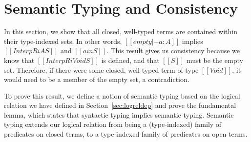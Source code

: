 \documentclass[acmsmall,screen=true,
\ifpublic review=false\else,review=true\fi
  ,anonymous=\ifanonymous true\else false\fi]{acmart}
\newcommand{\lang}{$\lambda^H$\xspace}
\newcommand{\scw}[1]{}
\newcommand{\yl}[1]{}
\begin{document}
\section{Semantic Typing and Consistency}
\label{sec:logrelproof}
\yl{todo: rename all variables from i,j to n}
\scw{Would it make sense to define the notation $a \in [\![A]\!]^i$ when
there exists some $S$ such that $[[InterpR i A S]]$ and $[[a in S]]$ ?}



In this section, we show that all closed, well-typed terms are contained
within their type-indexed sets. In other words, $[[empty |- a : A]]$ implies
$[[InterpR i A S]]$ and $[[a in S]]$.  This result gives us consistency
because we know that $[[InterpR i Void S]]$ is defined, and that $[[S]]$ must
be the empty set. Therefore, if there were some closed, well-typed term of type
$[[Void]]$, it would need to be a member of the empty set, a contradiction.

To prove this result, we define a notion of semantic typing based on the
logical relation we have defined in Section~\ref{sec:logreldep} and prove the
fundamental lemma, which states that syntactic typing implies semantic typing.
Semantic typing extends our logical relation from being a (type-indexed)
family of predicates on closed terms, to a type-indexed family of predicates
on open terms.
\end{document}
